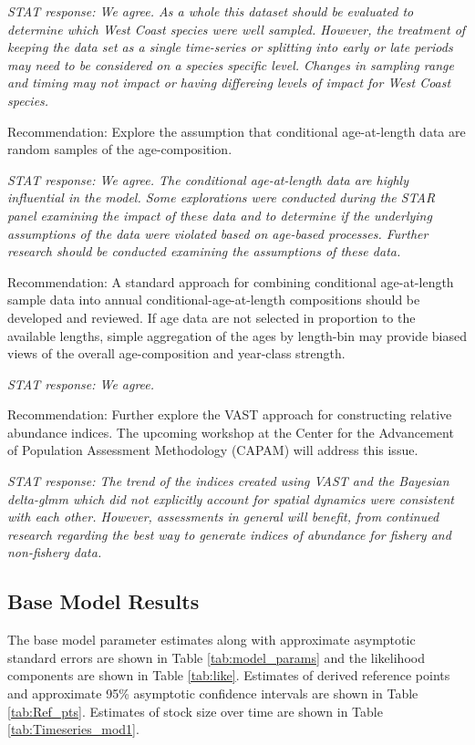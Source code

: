 \documentclass[12pt,]{article}
\begin{document}
\emph{STAT response: We agree. As a whole this dataset should be
evaluated to determine which West Coast species were well sampled.
However, the treatment of keeping the data set as a single time-series
or splitting into early or late periods may need to be considered on a
species specific level. Changes in sampling range and timing may not
impact or having differeing levels of impact for West Coast species.}

Recommendation: Explore the assumption that conditional age-at-length
data are random samples of the age-composition.

\emph{STAT response: We agree. The conditional age-at-length data are
highly influential in the model. Some explorations were conducted during
the STAR panel examining the impact of these data and to determine if
the underlying assumptions of the data were violated based on age-based
processes. Further research should be conducted examining the
assumptions of these data.}

Recommendation: A standard approach for combining conditional
age-at-length sample data into annual conditional-age-at-length
compositions should be developed and reviewed. If age data are not
selected in proportion to the available lengths, simple aggregation of
the ages by length-bin may provide biased views of the overall
age-composition and year-class strength.

\emph{STAT response: We agree.}

Recommendation: Further explore the VAST approach for constructing
relative abundance indices. The upcoming workshop at the Center for the
Advancement of Population Assessment Methodology (CAPAM) will address
this issue.

\emph{STAT response: The trend of the indices created using VAST and the
Bayesian delta-glmm which did not explicitly account for spatial
dynamics were consistent with each other. However, assessments in
general will benefit, from continued research regarding the best way to
generate indices of abundance for fishery and non-fishery data.}

\subsection{Base Model Results}\label{base-model-results}

The base model parameter estimates along with approximate asymptotic
standard errors are shown in Table \ref{tab:model_params} and the
likelihood components are shown in Table \ref{tab:like}. Estimates of
derived reference points and approximate 95\% asymptotic confidence
intervals are shown in Table \ref{tab:Ref_pts}. Estimates of stock size
over time are shown in Table \ref{tab:Timeseries_mod1}.
\end{document}
